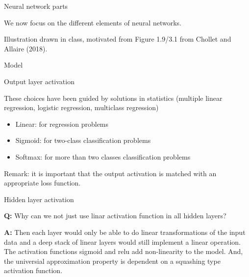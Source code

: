 \documentclass[10pt,ignorenonframetext,]{beamer}
\providecommand{\tightlist}{%
  \setlength{\itemsep}{0pt}\setlength{\parskip}{0pt}}
\begin{document}
\begin{frame}{Neural network parts}

We now focus on the different elements of neural networks.

Illustration drawn in class, motivated from Figure 1.9/3.1 from Chollet
and Allaire (2018).

\end{frame}

\begin{frame}

\begin{block}{Model}

\begin{block}{Output layer activation}

These choices have been guided by solutions in statistics (multiple
linear regression, logistic regression, multiclass regression)

\begin{itemize}
\tightlist
\item
  Linear: for regression problems
\item
  Sigmoid: for two-class classification problems
\item
  Softmax: for more than two classes classification problems
\end{itemize}

Remark: it is important that the output activation is matched with an
appropriate loss function.

\end{block}

\end{block}

\end{frame}

\begin{frame}

\begin{block}{Hidden layer activation}

\textbf{Q:} Why can we not just use linar activation function in all
hidden layers?

\end{block}

\end{frame}

\begin{frame}

\textbf{A:} Then each layer would only be able to do linear
transformations of the input data and a deep stack of linear layers
would still implement a linear operation. The activation functions
sigmoid and relu add non-linearity to the model. And, the universial
approximation property is dependent on a squashing type activation
function.

\end{frame}
\end{document}
